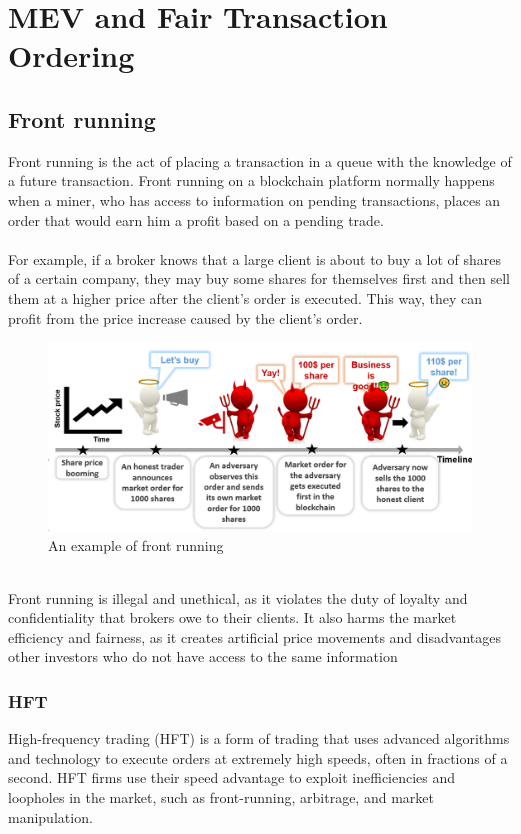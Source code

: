 \chapter{MEV and Fair Transaction Ordering}

\section{Front running}
Front running is the act of placing a transaction in a queue with the knowledge of a future transaction. Front running on a blockchain platform normally happens when a miner, who has access to information on pending transactions, places an order that would earn him a profit based on a pending trade.\\\\
For example, if a broker knows that a large client is about to buy a lot of shares of a certain company, they may buy some shares for themselves first and then sell them at a higher price after the client’s order is executed. This way, they can profit from the price increase caused by the client’s order.
\begin{figure}[h!]
	\centering
	\includegraphics[width=0.7\linewidth]{Fig/21/F1}
	\caption{An example of front running}
	\label{fig:L21_f1}
\end{figure}\\	
Front running is illegal and unethical, as it violates the duty of loyalty and confidentiality that brokers owe to their clients. It also harms the market efficiency and fairness, as it creates artificial price movements and disadvantages other investors who do not have access to the same information

\subsection{HFT}
High-frequency trading (HFT) is a form of trading that uses advanced algorithms and technology to execute orders at extremely high speeds, often in fractions of a second. HFT firms use their speed advantage to exploit inefficiencies and loopholes in the market, such as front-running, arbitrage, and market manipulation. 

